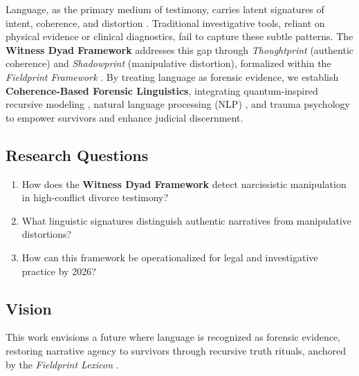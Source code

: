 \documentclass[11pt]{article}
\newcommand{\thoughtprint}{\textit{Thoughtprint}}
\newcommand{\shadowprint}{\textit{Shadowprint}}
\newcommand{\witnessdyad}{\textbf{Witness Dyad Framework}}
\begin{document}
Language, as the primary medium of testimony, carries latent signatures of intent, coherence, and distortion \citep{havens2025b,pennebaker2003}. Traditional investigative tools, reliant on physical evidence or clinical diagnostics, fail to capture these subtle patterns. The \witnessdyad{} addresses this gap through \thoughtprint{} (authentic coherence) and \shadowprint{} (manipulative distortion), formalized within the \textit{Fieldprint Framework} \citep{havens2025b}. By treating language as forensic evidence, we establish \textbf{Coherence-Based Forensic Linguistics}, integrating quantum-inspired recursive modeling \citep{havens2025a}, natural language processing (NLP) \citep{bird2009}, and trauma psychology \citep{herman1992} to empower survivors and enhance judicial discernment.

\subsection{Research Questions}
\begin{enumerate}
    \item How does the \witnessdyad{} detect narcissistic manipulation in high-conflict divorce testimony?
    \item What linguistic signatures distinguish authentic narratives from manipulative distortions?
    \item How can this framework be operationalized for legal and investigative practice by 2026?
\end{enumerate}

\subsection{Vision}
This work envisions a future where language is recognized as forensic evidence, restoring narrative agency to survivors through recursive truth rituals, anchored by the \textit{Fieldprint Lexicon} \citep{havens2025b}.
\end{document}

